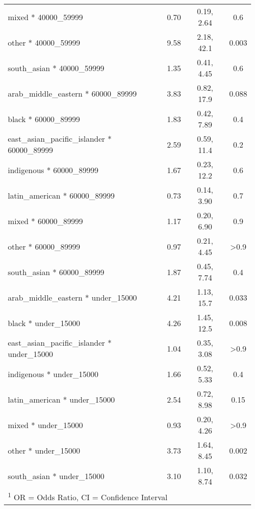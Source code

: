 \documentclass[
  letterpaper,
  DIV=11,
  numbers=noendperiod]{scrartcl}
\begin{document}
\begin{longtable}{lccc}
\hspace{1em}mixed * 40000\_59999 & 0.70 & 0.19, 2.64 & 0.6\\
\hspace{1em}other * 40000\_59999 & 9.58 & 2.18, 42.1 & 0.003\\
\addlinespace
\hspace{1em}south\_asian * 40000\_59999 & 1.35 & 0.41, 4.45 & 0.6\\
\hspace{1em}arab\_middle\_eastern * 60000\_89999 & 3.83 & 0.82, 17.9 & 0.088\\
\hspace{1em}black * 60000\_89999 & 1.83 & 0.42, 7.89 & 0.4\\
\hspace{1em}east\_asian\_pacific\_islander * 60000\_89999 & 2.59 & 0.59, 11.4 & 0.2\\
\hspace{1em}indigenous * 60000\_89999 & 1.67 & 0.23, 12.2 & 0.6\\
\addlinespace
\hspace{1em}latin\_american * 60000\_89999 & 0.73 & 0.14, 3.90 & 0.7\\
\hspace{1em}mixed * 60000\_89999 & 1.17 & 0.20, 6.90 & 0.9\\
\hspace{1em}other * 60000\_89999 & 0.97 & 0.21, 4.45 & >0.9\\
\hspace{1em}south\_asian * 60000\_89999 & 1.87 & 0.45, 7.74 & 0.4\\
\hspace{1em}arab\_middle\_eastern * under\_15000 & 4.21 & 1.13, 15.7 & 0.033\\
\addlinespace
\hspace{1em}black * under\_15000 & 4.26 & 1.45, 12.5 & 0.008\\
\hspace{1em}east\_asian\_pacific\_islander * under\_15000 & 1.04 & 0.35, 3.08 & >0.9\\
\hspace{1em}indigenous * under\_15000 & 1.66 & 0.52, 5.33 & 0.4\\
\hspace{1em}latin\_american * under\_15000 & 2.54 & 0.72, 8.98 & 0.15\\
\hspace{1em}mixed * under\_15000 & 0.93 & 0.20, 4.26 & >0.9\\
\addlinespace
\hspace{1em}other * under\_15000 & 3.73 & 1.64, 8.45 & 0.002\\
\hspace{1em}south\_asian * under\_15000 & 3.10 & 1.10, 8.74 & 0.032\\*
\multicolumn{4}{l}{\rule{0pt}{1em}\textsuperscript{1} OR = Odds Ratio, CI = Confidence Interval}\\
\end{longtable}
\end{document}
